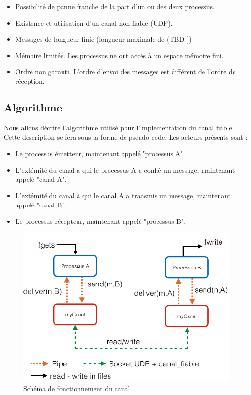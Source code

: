 \documentclass[a4paper, 10pt, french]{article}
\begin{document}
\begin{itemize}
	\item Possibilité de panne franche de la part d'un ou des deux processus.
	\item Existence et utilisation d'un canal non fiable (UDP).
	\item Messages de longueur finie (longueur maximale de  (TBD ))
	\item Mémoire limitée. Les processus ne ont accès à un espace mémoire fini.
	\item Ordre non garanti. L'ordre d'envoi des messages est différent de l'ordre de réception.
\end{itemize}


\subsection{Algorithme}
Nous allons décrire l'algorithme utilisé pour l'implémentation du canal fiable. Cette description se fera sous la forme de pseudo code. Les acteurs présents sont :
\begin{itemize}
	\item Le processus émetteur, maintenant appelé "processus A".
	\item L'extémité du canal à qui le processus A a confié un message, maintenant appelé "canal A".
	\item L'extémité du canal à qui le canal A a transmis un message, maintenant appelé "canal B".
	\item Le processus récepteur, maintenant appelé "processus B". \newline
\end{itemize}

\begin{figure}[!h]
\begin{center}
   	\includegraphics[scale=0.4]{exchange_stack.png}
	\caption{Schéma de fonctionnement du canal}
	\label{fig:canal}
\end{center}
\end{figure}
\end{document}
